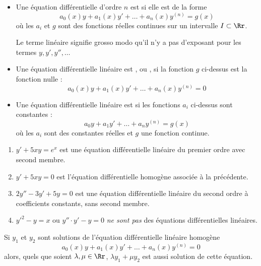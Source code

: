 \documentclass[class=report,crop=false]{standalone}
\begin{document}
\begin{itemize}
  \item Une équation différentielle d'ordre $n$ est  si elle est de la forme
$$a_0(x)y+a_1(x)y'+\dots +a_n(x)y^{(n)} = g(x)$$
où les $a_i$ et $g$ sont des fonctions réelles continues sur un intervalle $I\subset \Rr$.

Le terme linéaire signifie grosso modo qu'il n'y a pas d'exposant pour les termes $y,y',y'',\ldots$

  \item Une équation différentielle linéaire est 
  , ou 
  ,
  si la fonction $g$ ci-dessus est la fonction nulle :
  $$a_0(x)y+a_1(x)y'+\dots +a_n(x)y^{(n)} = 0$$

  \item Une équation différentielle linéaire est  si
  les fonctions $a_i$ ci-dessus sont constantes :
  $$a_0y+a_1y'+\dots +a_ny^{(n)} = g(x)$$
  où les $a_i$ sont des constantes réelles et $g$ une fonction continue.
\end{itemize}

\begin{exemple}
\sauteligne
\begin{enumerate}
  \item $y' + 5xy = e^x$ est une équation différentielle linéaire du premier ordre avec second membre.

  \item $y' + 5xy = 0$ est l'équation différentielle homogène associée à la précédente.

  \item $2y'' - 3y' + 5y = 0$ est une équation différentielle linéaire du second ordre à coefficients constants,
  sans second membre.


  \item $y'^2 - y = x$ ou $y'' \cdot  y' - y = 0$ \emph{ne sont pas} des équations différentielles linéaires.
\end{enumerate}
\end{exemple}



\begin{proposition}
Si $y_1$ et $y_2$ sont solutions de l'équation différentielle linéaire homogène
\begin{equation}
  a_0(x)y+a_1(x)y'+\dots +a_n(x)y^{(n)} = 0
  \label{eq:eqdifflin}
 \tag{$E_0$}
\end{equation}
alors, quels que soient $\lambda,\mu \in \Rr$, $\lambda y_1 + \mu y_2$ est aussi solution de cette équation.
\end{proposition}
\end{document}
